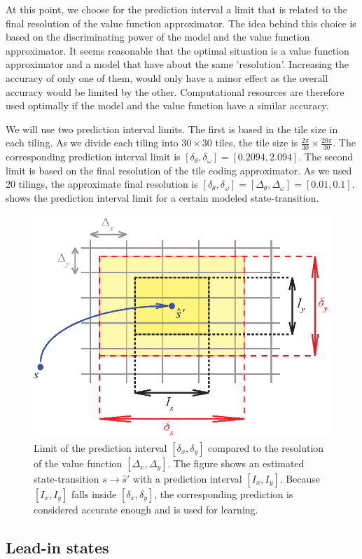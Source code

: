 At this point, we choose for the prediction interval a limit that is related to the final resolution of the value function approximator. The idea behind this choice is based on the discriminating power of the model and the value function approximator. It seems reasonable that the optimal situation is a value function approximator and a model that have about the same 'resolution'. Increasing the accuracy of only one of them, would only have a minor effect as the overall accuracy would be limited by the other. Computational resources are therefore used optimally if the model and the value function have a similar accuracy.  

We will use two prediction interval limits. The first is based in the tile size in each tiling. As we divide each tiling into $30\times 30$ tiles, the tile size is $\frac{2\pi}{30}\times \frac{20\pi}{30}$. The corresponding prediction interval limit is $[\delta_\theta, \delta_\omega]=[0.2094, 2.094]$. The second limit is based on the final resolution of the tile coding approximator. As we used 20 tilings, the approximate final resolution is $[\delta_\theta, \delta_\omega]=[\Delta_\theta,\Delta_\omega]=[0.01, 0.1]$.  shows the prediction interval limit for a certain modeled state-transition.
\begin{figure}[htbp]
	\centering
		\includegraphics[width=.5\textwidth]{img/TCvsPREDINT}
	\caption[Prediction interval]{Limit of the prediction interval $[\delta_x,\delta_y]$ compared to the resolution of the value function $[\Delta_x,\Delta_y]$. The figure shows an estimated state-transition $s\rightarrow \hat{s}'$ with a prediction interval $[I_x,I_y]$. Because $[I_x,I_y]$ falls inside $[\delta_x,\delta_y]$, the corresponding prediction is considered accurate enough and is used for learning.}
	\label{fig:TCvsPredInt}
\end{figure}




\subsection{Lead-in states}\label{sec:PS-lead in states}

